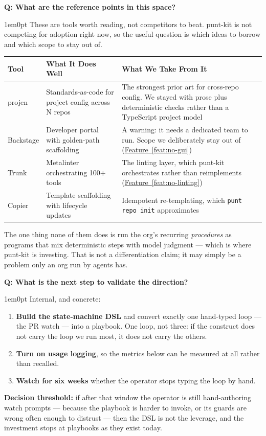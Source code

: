 \documentclass[11pt,letterpaper]{article}
\newcounter{faqnum}
\newenvironment{faqpair}[1]{%
  \needspace{4\baselineskip}%
  \vspace{0.5em}%
  \refstepcounter{faqnum}%
  \noindent\textbf{\color{SectionBlue}Q\thefaqnum: #1}\par\nopagebreak[4]%
  \vspace{0.2em}%
  \begin{adjustwidth}{1em}{0pt}%
  \setlength{\parindent}{0pt}%
}{%
  \end{adjustwidth}%
  \vspace{0.5em}%
}
\newcommand{\featureref}[1]{\hyperref[#1]{Feature~\ref*{#1}}}
\begin{document}
\begin{faqpair}{What are the reference points in this space?}\label{faq:competitors}
  These are tools worth reading, not competitors to beat. punt-kit is not
  competing for adoption right now, so the useful question is which ideas to
  borrow and which scope to stay out of.

  \renewcommand{\arraystretch}{1.4}
  \begin{tabularx}{\linewidth}{@{} l X X @{}}
  \toprule
  \textbf{Tool} & \textbf{What It Does Well} & \textbf{What We Take From It} \\
  \midrule
  projen & Standards-as-code for project config across N
    repos~\cite{projen2024github} & The strongest prior art for cross-repo
    config. We stayed with prose plus deterministic checks rather than a
    TypeScript project model \\
  Backstage & Developer portal with golden-path
    scaffolding~\cite{backstage2025fiveyears} & A warning: it needs a dedicated
    team to run. Scope we deliberately stay out of (\featureref{feat:no-gui}) \\
  Trunk & Metalinter orchestrating 100+
    tools~\cite{trunkio2024codequality} & The linting layer, which punt-kit
    orchestrates rather than reimplements (\featureref{feat:no-linting}) \\
  Copier & Template scaffolding with lifecycle
    updates~\cite{copier2024comparisons} & Idempotent re-templating, which
    \texttt{punt repo init} approximates \\
  \bottomrule
  \end{tabularx}
  \renewcommand{\arraystretch}{1.0}

  \medskip
  The one thing none of them does is run the org's recurring
  \emph{procedures} as programs that mix deterministic steps with model
  judgment --- which is where punt-kit is investing. That is not a
  differentiation claim; it may simply be a problem only an org run by agents
  has.
\end{faqpair}

\begin{faqpair}{What is the next step to validate the direction?}\label{faq:next-step}
  Internal, and concrete:
  \begin{enumerate}[nosep]
    \item \textbf{Build the state-machine DSL} and convert exactly one
      hand-typed loop --- the PR watch --- into a playbook. One loop, not
      three: if the construct does not carry the loop we run most, it does not
      carry the others.
    \item \textbf{Turn on usage logging}, so the metrics below can be measured
      at all rather than recalled.
    \item \textbf{Watch for six weeks} whether the operator stops typing the
      loop by hand.
  \end{enumerate}
  \textbf{Decision threshold:} if after that window the operator is still
  hand-authoring watch prompts --- because the playbook is harder to invoke,
  or its guards are wrong often enough to distrust --- then the DSL is not the
  leverage, and the investment stops at playbooks as they exist today.
\end{faqpair}
\end{document}
